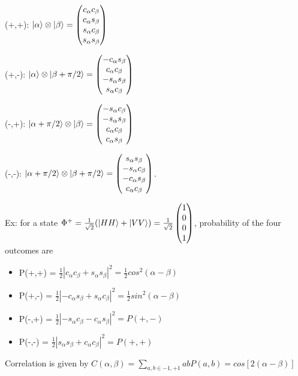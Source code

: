 \documentclass[a4paper,11pt,portrait]{article}
\begin{document}
\begin{multicols}{3}
(+,+): $\ket{\alpha} \otimes \ket{\beta} = \begin{pmatrix}
    c_\alpha c_\beta \\
    c_\alpha s_\beta \\
    s_\alpha c_\beta \\
    s_\alpha s_\beta
\end{pmatrix}$

(+,-): $\ket{\alpha} \otimes \ket{\beta + \pi/2} = \begin{pmatrix}
    -c_\alpha s_\beta \\
    c_\alpha c_\beta \\
    -s_\alpha s_\beta \\
    s_\alpha c_\beta
\end{pmatrix}$

(-,+): $\ket{\alpha + \pi/2} \otimes \ket{\beta } = \begin{pmatrix}
    -s_\alpha c_\beta \\
    -s_\alpha s_\beta \\
    c_\alpha c_\beta \\
    c_\alpha s_\beta
\end{pmatrix}$

(-,-): $\ket{\alpha + \pi/2} \otimes \ket{\beta + \pi/2 } = \begin{pmatrix}
    s_\alpha s_\beta \\
    -s_\alpha c_\beta \\
    -c_\alpha s_\beta \\
    c_\alpha c_\beta
\end{pmatrix}$. 

Ex: for a state $\Phi^+ = \frac{1}{\sqrt{2}}(\ket{HH} + \ket{VV}) = \frac{1}{\sqrt{2}}\begin{pmatrix}
    1 \\
    0 \\
    0 \\
    1 \\
\end{pmatrix}$, probability of the four outcomes are
\begin{itemize}
    \item P(+,+) = $\frac{1}{2}|c_\alpha c_\beta + s_\alpha s_\beta|^2 = \frac{1}{2}cos^2(\alpha - \beta)$

    \item P(+,-) = $\frac{1}{2}|-c_\alpha s_\beta + s_\alpha c_\beta|^2 = \frac{1}{2}sin^2(\alpha - \beta)$

    \item P(-,+) = $\frac{1}{2}|-s_\alpha c_\beta -c_\alpha s_\beta|^2 = P(+,-)$

    \item P(-,-) = $\frac{1}{2}|s_\alpha s_\beta +c_\alpha c_\beta|^2 = P(+,+)$
\end{itemize}
Correlation is given by $C(\alpha, \beta) = \sum_{a,b \in {-1,+1}} ab P(a,b) = cos[2(\alpha - \beta)]$

\end{multicols} 
\end{document}
